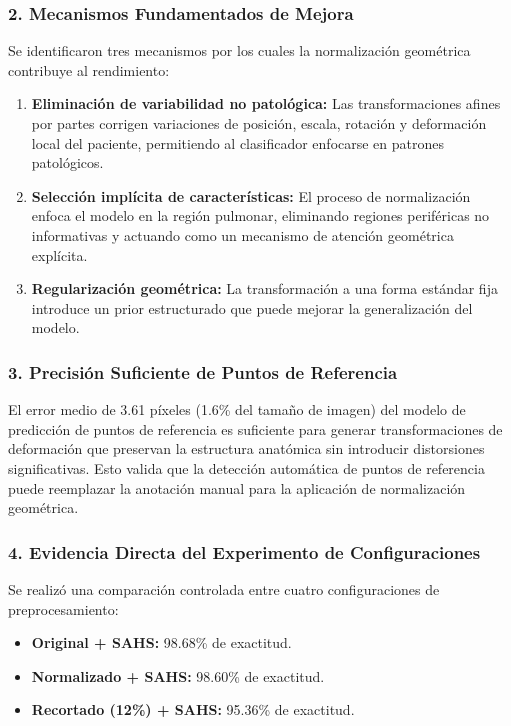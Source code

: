 \subsubsection{2. Mecanismos Fundamentados de Mejora}

Se identificaron tres mecanismos por los cuales la normalización geométrica contribuye al rendimiento:

\begin{enumerate}
    \item \textbf{Eliminación de variabilidad no patológica:} Las transformaciones afines por partes corrigen variaciones de posición, escala, rotación y deformación local del paciente, permitiendo al clasificador enfocarse en patrones patológicos.

    \item \textbf{Selección implícita de características:} El proceso de normalización enfoca el modelo en la región pulmonar, eliminando regiones periféricas no informativas y actuando como un mecanismo de atención geométrica explícita.

    \item \textbf{Regularización geométrica:} La transformación a una forma estándar fija introduce un prior estructurado que puede mejorar la generalización del modelo.
\end{enumerate}

\subsubsection{3. Precisión Suficiente de Puntos de Referencia}

El error medio de 3.61 píxeles (1.6\% del tamaño de imagen) del modelo de predicción de puntos de referencia es suficiente para generar transformaciones de deformación que preservan la estructura anatómica sin introducir distorsiones significativas. Esto valida que la detección automática de puntos de referencia puede reemplazar la anotación manual para la aplicación de normalización geométrica.

\subsubsection{4. Evidencia Directa del Experimento de Configuraciones}

Se realizó una comparación controlada entre cuatro configuraciones de preprocesamiento:

\begin{itemize}
    \item \textbf{Original + SAHS:} 98.68\% de exactitud.
    \item \textbf{Normalizado + SAHS:} 98.60\% de exactitud.
    \item \textbf{Recortado (12\%) + SAHS:} 95.36\% de exactitud.
\end{itemize}

